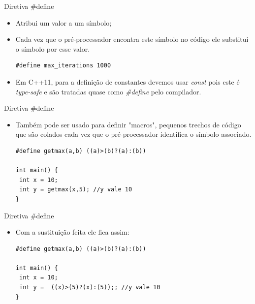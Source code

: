 \documentclass[12pt,table,xcolor={dvipsnames}]{beamer}
\begin{document}
\begin{frame}[fragile]{Diretiva \#define}
\begin{itemize}
\item Atribui um valor a um símbolo;
\item Cada vez que o pré-processador encontra este símbolo no código ele substitui o símbolo por esse valor.
\begin{lstlisting}
#define max_iterations 1000
\end{lstlisting}
\item Em C++11, para a definição de constantes devemos usar \textit{const} pois este é \textit{type-safe} e são tratadas quase como \textit{\#define} pelo compilador.
\end{itemize}
\end{frame}

\begin{frame}[fragile]{Diretiva \#define}
\begin{itemize}
\item Também pode ser usado para definir "macros", pequenos trechos de código que são colados cada vez que o pré-processador identifica o símbolo associado.
\begin{lstlisting}
#define getmax(a,b) ((a)>(b)?(a):(b))

int main() {
 int x = 10;
 int y = getmax(x,5); //y vale 10
}
\end{lstlisting}
\end{itemize}
\end{frame}

\begin{frame}[fragile]{Diretiva \#define}
\begin{itemize}
\item Com a sustituição feita ele fica assim:
\begin{lstlisting}
#define getmax(a,b) ((a)>(b)?(a):(b))

int main() {
 int x = 10;
 int y =  ((x)>(5)?(x):(5));; //y vale 10
}
\end{lstlisting}
\end{itemize}
\end{frame}
\end{document}
